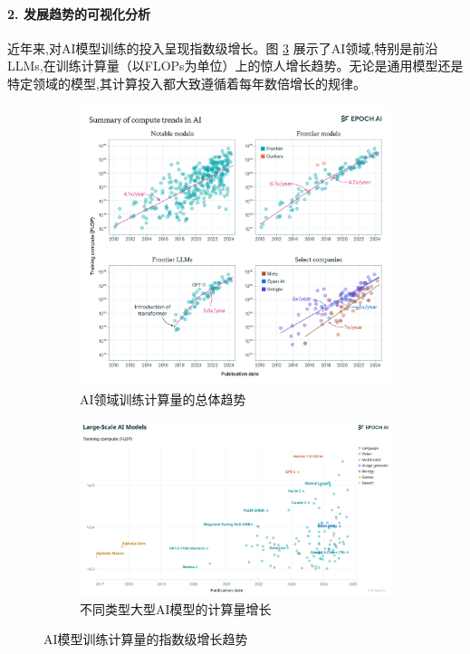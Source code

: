\paragraph{2. 发展趋势的可视化分析}
近年来,对AI模型训练的投入呈现指数级增长。图 \ref{fig:llm_compute_trends} 展示了AI领域,特别是前沿LLMs,在训练计算量（以FLOPs为单位）上的惊人增长趋势。无论是通用模型还是特定领域的模型,其计算投入都大致遵循着每年数倍增长的规律。
\begin{figure}[htbp]
    \centering
    \begin{subfigure}[b]{0.48\textwidth}
        \centering
        \includegraphics[width=\textwidth]{figures/LLM1.png}
        \caption{AI领域训练计算量的总体趋势}
        \label{fig:llm_compute_summary}
    \end{subfigure}
    \hfill
    \begin{subfigure}[b]{0.48\textwidth}
        \centering
        \includegraphics[width=\textwidth]{figures/LLM2.png}
        \caption{不同类型大型AI模型的计算量增长}
        \label{fig:llm_compute_by_type}
    \end{subfigure}
    \caption{AI模型训练计算量的指数级增长趋势}
    \label{fig:llm_compute_trends}
\end{figure}

